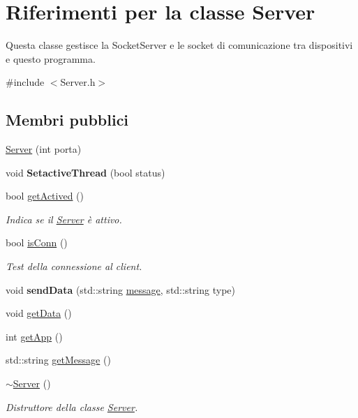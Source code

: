 \hypertarget{classServer}{\section{\-Riferimenti per la classe \-Server}
\label{classServer}
}


\-Questa classe gestisce la \-Socket\-Server e le socket di comunicazione tra dispositivi e questo programma.  




{\ttfamily \#include $<$\-Server.\-h$>$}

\subsection*{\-Membri pubblici}
\begin{DoxyCompactItemize}
\item 
\hyperlink{classServer_af11aa19a47fed238c575c432bd7f1ce9}{\-Server} (int porta)
\item 
\hypertarget{classServer_a85e0c80096c05bec02dfb8f40d1c5f11}{void {\bfseries \-Setactive\-Thread} (bool status)}\label{classServer_a85e0c80096c05bec02dfb8f40d1c5f11}

\item 
bool \hyperlink{classServer_a23b2a4e9819bd2ad2dbb6a0ccc63adc2}{get\-Actived} ()
\begin{DoxyCompactList}\small\item\em \-Indica se il \hyperlink{classServer}{\-Server} è attivo. \end{DoxyCompactList}\item 
bool \hyperlink{classServer_a343411b66598c4a18a85ff8ed3bc70d3}{is\-Conn} ()
\begin{DoxyCompactList}\small\item\em \-Test della connessione al client. \end{DoxyCompactList}\item 
\hypertarget{classServer_a3759ce50a4c6d4e88852bc299c079e11}{void {\bfseries send\-Data} (std\-::string \hyperlink{classServer_a0493d162448907be150f830457808e51}{message}, std\-::string type)}\label{classServer_a3759ce50a4c6d4e88852bc299c079e11}

\item 
void \hyperlink{classServer_a212514d665699ff74c168b81303be815}{get\-Data} ()
\item 
int \hyperlink{classServer_abf528e3dd8190943593c4094b20201f2}{get\-App} ()
\item 
std\-::string \hyperlink{classServer_a968480d1fc8a455f708fdc5ec9f1e7d2}{get\-Message} ()
\item 
\hypertarget{classServer_a4b3aa2579cb1c8cd1d069582c14d0fa6}{\hyperlink{classServer_a4b3aa2579cb1c8cd1d069582c14d0fa6}{$\sim$\-Server} ()}\label{classServer_a4b3aa2579cb1c8cd1d069582c14d0fa6}

\begin{DoxyCompactList}\small\item\em \-Distruttore della classe \hyperlink{classServer}{\-Server}. \end{DoxyCompactList}\end{DoxyCompactItemize}
